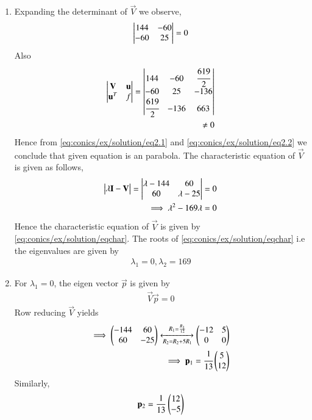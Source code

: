\begin{enumerate}
\item Expanding the determinant of $\vec{V}$ we observe, 
\begin{align}
\begin{vmatrix}144&-60\\-60&25\end{vmatrix} = 0 \label{eq:conics/ex/solution/eq2.1}
\end{align}
Also
\begin{align}
    \begin{vmatrix}\mathbf{V} & \mathbf{u} \\ \mathbf{u}^T & f\end{vmatrix}=
    \begin{vmatrix}144&-60 & \cfrac{619}{2} \\-60&25 & -136 \\ \cfrac{619}{2} & -136 & 663\end{vmatrix} \\
    \neq 0\label{eq:conics/ex/solution/eq2.2}
\end{align}
Hence from \eqref{eq:conics/ex/solution/eq2.1} and \eqref{eq:conics/ex/solution/eq2.2} we conclude that given equation is an parabola. The characteristic equation of $\vec{V}$ is given as follows,
\begin{align}
\begin{vmatrix}\lambda\mathbf{I}-\mathbf{V}\end{vmatrix} = \begin{vmatrix}\lambda-144&60\\60&\lambda-25\end{vmatrix} &= 0\\
\implies \lambda^2-169\lambda &= 0\label{eq:conics/ex/solution/eqchar}
\end{align}
Hence the characteristic equation of $\vec{V}$ is given by \eqref{eq:conics/ex/solution/eqchar}. The roots of \eqref{eq:conics/ex/solution/eqchar} i.e the eigenvalues are given by
\begin{align}
\lambda_1=0, \lambda_2=169\label{eq:conics/ex/solution/eqeigenvals}    
\end{align}
\item For $\lambda_1 = 0$, the eigen vector $\vec{p}$ is given by 
\begin{align}
\vec{V}\vec{p} = 0
\end{align}
Row reducing $\vec{V}$ yields
\begin{align}
\implies
\begin{pmatrix}-144&60\\60&-25\end{pmatrix}\xleftrightarrow[R_2=R_2+5R_1]{R_1=\frac{R_1}{12}}\begin{pmatrix}-12&5\\0&0\end{pmatrix}\\
\implies\mathbf{p}_1=\cfrac{1}{13}\begin{pmatrix}5\\12\end{pmatrix} \label{eq:conics/ex/solution/eq2.3}
\end{align}
Similarly, 
\begin{align}
\mathbf{p}_2=\frac{1}{13}\begin{pmatrix}12\\-5\end{pmatrix} 
\end{align}

\end{enumerate}
